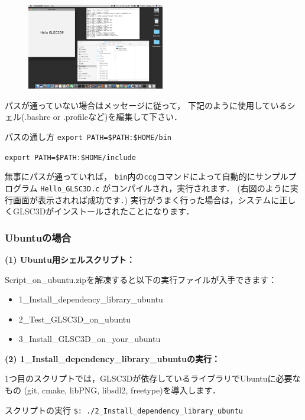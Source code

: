 \documentclass[platex,a4paper,12pt]{jsarticle}%
\begin{document}
\begin{figure}
\includegraphics[width=60mm]{Canvas_Hello_GLSD3D.eps}
\vspace{-4\baselineskip}
\end{figure}

パスが通っていない場合はメッセージに従って，
下記のように使用しているシェル(.bashrc or .profileなど)を編集して下さい．

\begin{itembox}[l]{パスの通し方}
\verb|export PATH=$PATH:$HOME/bin|
	
\verb|export PATH=$PATH:$HOME/include|
\end{itembox}

無事にパスが通っていれば，
\verb|bin|内の\verb|ccg|コマンドによって自動的にサンプルプログラム \verb|Hello_GLSC3D.c| がコンパイルされ，実行されます．
(右図のように実行画面が表示されれば成功です．)
実行がうまく行った場合は，システムに正しくGLSC3Dがインストールされたことになります．

\subsubsection{Ubuntuの場合}

\noindent 
{\bf (1) Ubuntu用シェルスクリプト：} 

Script\_on\_ubuntu.zipを解凍すると以下の実行ファイルが入手できます：
\begin{itemize}
\item[] 1\_Install\_dependency\_library\_ubuntu
\item[] 2\_Test\_GLSC3D\_on\_ubuntu
\item[] 3\_Install\_GLSC3D\_on\_your\_ubuntu
\end{itemize}

\noindent 
{\bf (2) 1\_Install\_dependency\_library\_ubuntuの実行：} 

1つ目のスクリプトでは，GLSC3Dが依存しているライブラリでUbuntuに必要なもの
(git, cmake, libPNG, libsdl2, freetype)を導入します．

\begin{itembox}[l]{スクリプトの実行}
\verb|$: ./2_Install_dependency_library_ubuntu|
\end{itembox}
\end{document}
